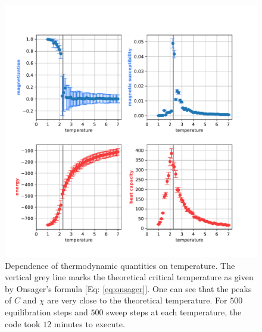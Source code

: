 {\begin{figure}[H]
    \centering
    \includegraphics[width=\linewidth]{latex_source/images/ising/2d_scaling.pdf}
    \caption{Dependence of thermodynamic quantities on temperature. The vertical grey line marks the theoretical critical temperature as given by Onsager's formula [Eq: \ref{eq:onsager}]. One can see that the peaks of $C$ and $\chi$ are very close to the theoretical temperature. For $500$ equilibration steps and $500$ sweep steps at each temperature, the code took $12$ minutes to execute.}
    \label{fig:2d_scaling}
\end{figure}
}